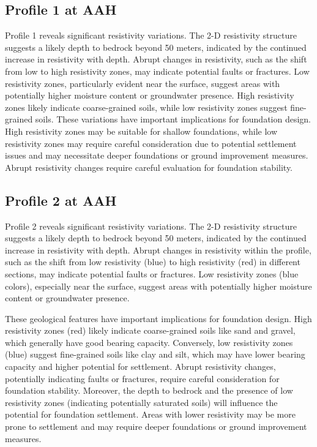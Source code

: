 \documentclass[12pt,a4paper]{report}
\begin{document}
\subsection{Profile 1 at AAH}
Profile 1 reveals significant resistivity variations. The 2-D resistivity structure suggests a likely depth to bedrock beyond 50 meters, indicated by the continued increase in resistivity with depth. Abrupt changes in resistivity, such as the shift from low to high resistivity zones, may indicate potential faults or fractures. Low resistivity zones, particularly evident near the surface, suggest areas with potentially higher moisture content or groundwater presence. High resistivity zones likely indicate coarse-grained soils, while low resistivity zones suggest fine-grained soils. These variations have important implications for foundation design. High resistivity zones may be suitable for shallow foundations, while low resistivity zones may require careful consideration due to potential settlement issues and may necessitate deeper foundations or ground improvement measures. Abrupt resistivity changes require careful evaluation for foundation stability.

\subsection{Profile 2 at AAH}
Profile 2 reveals significant resistivity variations. The 2-D resistivity structure suggests a likely depth to bedrock beyond 50 meters, indicated by the continued increase in resistivity with depth. Abrupt changes in resistivity within the profile, such as the shift from low resistivity (blue) to high resistivity (red) in different sections, may indicate potential faults or fractures. Low resistivity zones (blue colors), especially near the surface, suggest areas with potentially higher moisture content or groundwater presence.

These geological features have important implications for foundation design. High resistivity zones (red) likely indicate coarse-grained soils like sand and gravel, which generally have good bearing capacity. Conversely, low resistivity zones (blue) suggest fine-grained soils like clay and silt, which may have lower bearing capacity and higher potential for settlement. Abrupt resistivity changes, potentially indicating faults or fractures, require careful consideration for foundation stability. Moreover, the depth to bedrock and the presence of low resistivity zones (indicating potentially saturated soils) will influence the potential for foundation settlement. Areas with lower resistivity may be more prone to settlement and may require deeper foundations or ground improvement measures.
\end{document}
